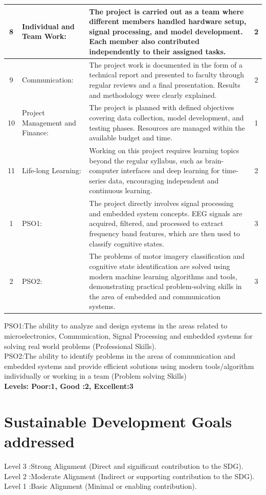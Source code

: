 \begin{appendices}
\begin{longtable}{|c|p{4cm}|p{7.5cm}|c|}
\hline
8 & Individual and Team Work: & The project is carried out as a team where different members handled hardware setup, signal processing, and model development. Each member also contributed independently to their assigned tasks. & 2 \\
\hline
9 & Communication: & The project work is documented in the form of a technical report and presented to faculty through regular reviews and a final presentation. Results and methodology were clearly explained. & 2 \\
\hline
10 & Project Management and Finance: & The project is planned with defined objectives covering data collection, model development, and testing phases. Resources are managed within the available budget and time. & 1 \\
\hline
11 & Life-long Learning: & Working on this project requires learning topics beyond the regular syllabus, such as brain-computer interfaces and deep learning for time-series data, encouraging independent and continuous learning. & 2 \\
\hline
1 & PSO1: & The project directly involves signal processing and embedded system concepts. EEG signals are acquired, filtered, and processed to extract frequency band features, which are then used to classify cognitive states. & 3 \\
\hline
2 & PSO2: & The problems of motor imagery classification and cognitive state identification are solved using modern machine learning algorithms and tools, demonstrating practical problem-solving skills in the area of embedded and communication systems. & 3 \\
\hline
\end{longtable}


PSO1:The ability to analyze and design systems in the areas related to microelectronics, Communication, Signal Processing and embedded systems for solving real world problems (Professional Skills).\\
PSO2:The ability to identify problems in the areas of communication and embedded systems and provide efficient solutions using modern tools/algorithm individually or working in a team (Problem solving Skills)
 \\ {\bf Levels: Poor:1, Good :2, Excellent:3}



\chapter{Sustainable Development Goals addressed}
  Level 3 :Strong Alignment (Direct and significant contribution to the SDG).\\
Level 2 :Moderate Alignment (Indirect or supporting contribution to the SDG).\\
Level 1 :Basic Alignment (Minimal or enabling contribution).\\


\end{appendices}
